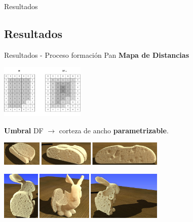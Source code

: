 \documentclass[spanish,unknownkeysallowed,10pt]{beamer}
\begin{document}



\begin{frame}
\begin{block}{}
\begin{center}
\vspace{1cm}
\huge{Resultados}
\vspace{1cm}
\end{center}
\end{block}
\end{frame}

\subsection{Resultados}


\begin{frame}{Resultados - Proceso formación Pan}
\textbf{Mapa de Distancias}
\centerline{\includegraphics[width=4cm]{../figures/DistanceTransform}}

\textbf{Umbral} DF $\rightarrow$ corteza de ancho \textbf{parametrizable}.

\vspace{0.3cm}

\centerline{\includegraphics[width=8cm]{../figures/prebakebread}}

\centerline{\includegraphics[width=8cm]{../figures/prebakebunny}}
\end{frame}
\end{document}
